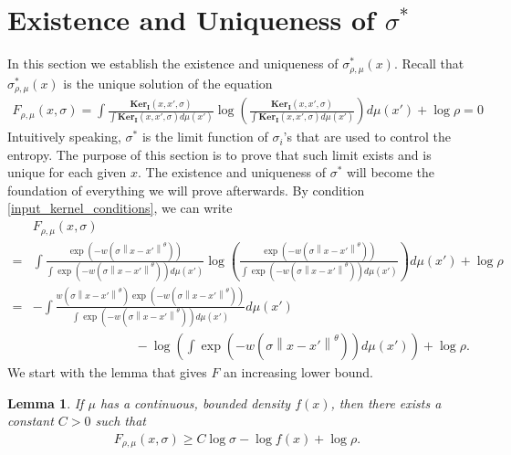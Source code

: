 \documentclass[10pt]{article}
\newcommand{\norm}[1]{\left\lVert#1\right\rVert}
\newtheorem{lemma}{\bf Lemma}
\newenvironment{Proof of lemma}{\noindent{\bf Proof of Lemma}}{\hfill$\Box$\newline}
\newenvironment{Proof of claim}{\noindent{\bf Proof of claim}}{\hfill$\Box$\newline}
\newenvironment{Proof of theorem}{\noindent{\bf Proof of Theorem}}{\hfill\scriptsize{$\Box$}\newline}
\newenvironment{Proof of theorems}{\noindent{\bf Proof of Theorems}}{\hfill$\Box$\newline}
\newenvironment{Proof of proposition}{\noindent{\bf Proof of Proposition}}{\hfill$\Box$\newline}
\newenvironment{Proof of propositions}{\noindent{\bf Proof of Propositions}}{\hfill$\Box$\newline}
\newenvironment{Proof of exercise}{\noindent{\it Proof of Exercise:}}{\hfill$\Box$}
\numberwithin{equation}{section}
\newcommand{\ki}{\mathbf{Ker}_{\mathbf{I}}}
\begin{document}
\section{Existence and Uniqueness of \texorpdfstring{$\sigma^*$}{sigma-star}}\label{tsne:sec:existence_uniqueness}
In this section we establish the existence and uniqueness of $\sigma^*_{\rho,\mu}(x)$. Recall that $\sigma^*_{\rho,\mu}(x)$ is the unique solution of the equation
\begin{align}
    F_{\rho,\mu}(x,\sigma) = \int \frac{\ki(x,x',\sigma)}{\int \ki(x,x',\sigma)d\mu(x')} \log \left(\frac{\ki(x,x',\sigma)}{\int \ki(x,x',\sigma)d\mu(x')}\right) d\mu(x') + \log \rho = 0
\end{align}
Intuitively speaking, $\sigma^*$ is the limit function of $\sigma_i$'s that are used to control the entropy. The purpose of this section is to prove that such limit exists and is unique for each given $x$. The existence and uniqueness of $\sigma^*$ will become the foundation of everything we will prove afterwards. By condition \ref{input_kernel_conditions}, we can write
\begin{align} \label{big_F_formula}
      & F_{\rho,\mu}(x,\sigma) \nonumber                                                                                                                                                                                                                    \\
    = & \int \frac{\exp(-w(\sigma\norm{x-x'}^{\theta}))}{\int \exp(-w(\sigma\norm{x-x'}^{\theta})) d\mu(x')} \log\left(\frac{\exp(-w(\sigma\norm{x-x'}^{\theta}))}{\int \exp(-w(\sigma\norm{x-x'}^{\theta})) d\mu(x')}\right)d\mu(x') + \log \rho \nonumber \\
    = & -\int \frac{w(\sigma\norm{x-x'}^{\theta})\exp(-w(\sigma\norm{x-x'}^{\theta}))}{\int \exp(-w(\sigma\norm{x-x'}^{\theta})) d\mu(x')} d\mu(x') \nonumber                                                                                               \\
      & \qquad \qquad \qquad \qquad - \log \left(\int \exp(-w(\sigma\norm{x-x'}^{\theta}))d\mu(x')\right)  + \log \rho.
\end{align}
We start with the lemma that gives $F$ an increasing lower bound.
\begin{lemma} \label{existence_uniqueness:existence_lemma}
    If $\mu$ has a continuous, bounded density $f(x)$, then there exists a constant $C>0$ such that
    \begin{align}  \label{big_F_lowerbound_final}
        F_{\rho,\mu}(x,\sigma) \geq C \log \sigma - \log f(x) + \log \rho.
    \end{align}
\end{lemma}
\end{document}
